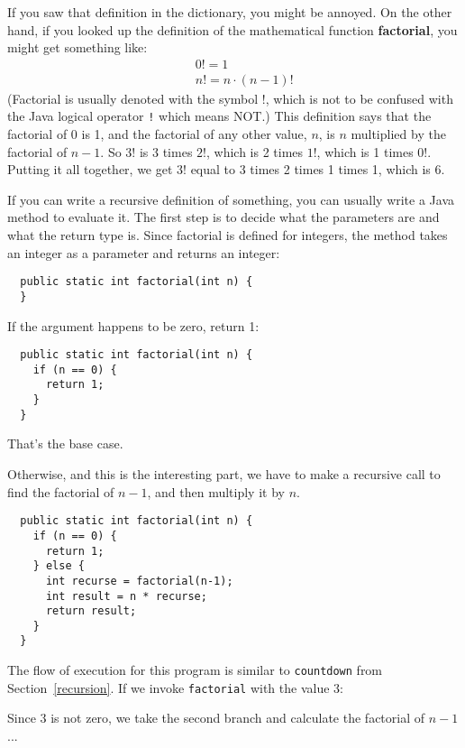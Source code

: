 \documentclass{book}
\begin{document}
If you saw that definition in the dictionary, you might be
annoyed.  On the other hand, if you looked up the definition
of the mathematical function {\bf factorial}, you might
get something like:
%
\begin{eqnarray*}
&&  0! = 1 \\
&&  n! = n \cdot(n-1)!
\end{eqnarray*}
%
(Factorial is usually denoted with the symbol $!$, which is
not to be confused with the Java logical operator {\tt !} which
means NOT.)  This definition says that the factorial of 0 is 1,
and the factorial of any other value, $n$, is $n$ multiplied
by the factorial of $n-1$.  So $3!$ is 3 times $2!$, which is 2 times
$1!$, which is 1 times $0!$.  Putting it all together, we get
$3!$ equal to 3 times 2 times 1 times 1, which is 6.

If you can write a recursive definition of something, you can usually
write a Java method to evaluate it.  The first step is to decide what
the parameters are and what the return type is.  Since factorial is
defined for integers, the method takes an
integer as a parameter and returns an integer:

\begin{verbatim}
  public static int factorial(int n) {
  }
\end{verbatim}

\noindent If the argument happens to be zero, return 1:

\begin{verbatim}
  public static int factorial(int n) {
    if (n == 0) {
      return 1;
    }
  }
\end{verbatim}
%
That's the base case.

Otherwise, and this is the interesting part, we have to make
a recursive call to find the factorial of $n-1$, and then
multiply it by $n$.

\begin{verbatim}
  public static int factorial(int n) {
    if (n == 0) {
      return 1;
    } else {
      int recurse = factorial(n-1);
      int result = n * recurse;
      return result;
    }
  }
\end{verbatim}
%
The flow of execution for this program is similar to {\tt countdown}
from Section~\ref{recursion}.
If we invoke {\tt factorial} with the value 3:

Since 3 is not zero, we take the second branch and calculate
the factorial of $n-1$...
\end{document}
